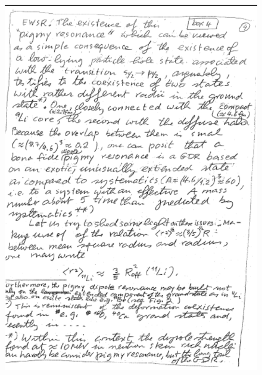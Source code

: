 \documentclass[a4paper,11pt]{book}
\numberwithin{equation}{section}
\numberwithin{figure}{section}
\numberwithin{table}{section}
\begin{document}
\begin{figure}
\centerline{\includegraphics*[width=\textwidth,angle=0]{figs/box4_5.pdf}}
\end{figure}
\end{document}
